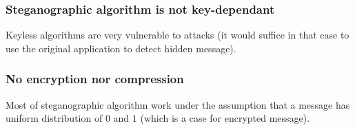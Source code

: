\subsubsection{Steganographic algorithm is not key-dependant}
Keyless algorithms are very vulnerable to attacks (it would suffice in that case
to use the original application to detect hidden message).

\subsubsection{No encryption nor compression}
Most of steganographic algorithm work under the assumption that a message has uniform distribution
of $0$ and $1$ (which is a case for encrypted message).

